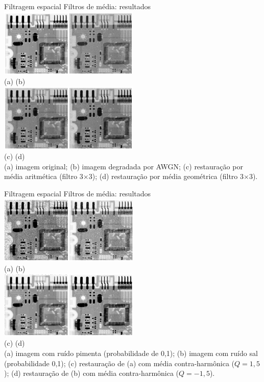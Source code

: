 \begin{slide}{Filtragem espacial}
	Filtros de média: resultados\\
	\centering
	\includegraphics[width=0.5\textwidth]{figs/5-7ab}\\
	\tiny{(a)\hspace{4cm} (b)}\\
	\includegraphics[width=0.5\textwidth]{figs/5-7cd}\\
	\tiny{(c)\hspace{4cm} (d)}\\
	\tiny{(a) imagem original; (b) imagem degradada por AWGN; (c) restauração por média aritmética (filtro 3$\times$3); (d) restauração por média geométrica (filtro 3$\times$3).}
\end{slide}
\begin{slide}{Filtragem espacial}
	Filtros de média: resultados\\
	\centering
	\includegraphics[width=0.5\textwidth]{figs/5-8ab}\\
	\tiny{(a)\hspace{4cm} (b)}\\
	\includegraphics[width=0.5\textwidth]{figs/5-8cd}\\
	\tiny{(c)\hspace{4cm} (d)}\\
	\tiny{(a) imagem com ruído pimenta (probabilidade de 0,1); (b) imagem com ruído sal (probabilidade 0,1); (c) restauração de (a) com média contra-harmônica ($Q = 1,5$); (d) restauração de (b) com  média contra-harmônica ($Q=-1,5$).}
\end{slide}

